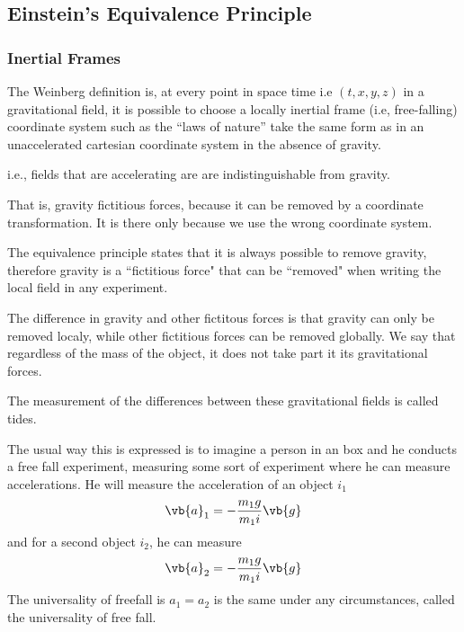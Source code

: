 
\subsection{Einstein's Equivalence Principle}
	\subsubsection{Inertial Frames}
		The Weinberg definition is, at every point in space time i.e $(t,x,y,z)$ in a gravitational field,
		it is possible to choose a locally inertial frame (i.e, free-falling)
		coordinate system such as the ``laws of nature'' take the same form
		as in an unaccelerated cartesian coordinate system in the absence of gravity.

		i.e., fields that are accelerating are are indistinguishable from gravity.
		
		That is, gravity fictitious forces, because it can be removed by a coordinate
		transformation. It is there only because we use the wrong coordinate system.

		The equivalence principle states that it is always possible to remove gravity,
		therefore gravity is a ``fictitious force" that can be ``removed" when writing
		the local field in any experiment.

		The difference in gravity and other fictitous forces is that gravity can only be
		removed localy, while other fictitious forces can be removed globally.
		We say that regardless of the mass of the object, it does not take part it its gravitational forces.

		The measurement of the differences between these gravitational fields is called tides.

		The usual way this is expressed is to imagine a person in an box and he conducts a free fall experiment,
		measuring some sort of experiment where he can measure accelerations. He will measure the acceleration of an object $i_1$
		\begin{equation}
			\vb{a}_1 = -\frac{m_1g}{m_1i} \vb{g}
		\end{equation}
		and for a second object $i_2$, he can measure
		\begin{equation}
			\vb{a}_2 = -\frac{m_1g}{m_1i} \vb{g}
		\end{equation}
		The universality of freefall is $a_1 = a_2$ is the same under any circumstances, called the universality of free fall.

